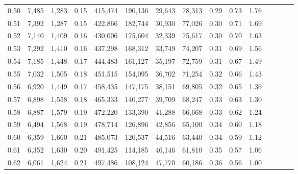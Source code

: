 \begin{tabular}{rrrcrrrrrrrrrrr}
0.50 &  7,485 &  1,283 &                                       0.15 &  415,474 &  190,136 &   29,643 &   78,313 &  0.29 &  0.73 &                         1.76 \\
0.51 &  7,392 &  1,287 &                                       0.15 &  422,866 &  182,744 &   30,930 &   77,026 &  0.30 &  0.71 &                         1.69 \\
0.52 &  7,140 &  1,409 &                                       0.16 &  430,006 &  175,604 &   32,339 &   75,617 &  0.30 &  0.70 &                         1.63 \\
0.53 &  7,292 &  1,410 &                                       0.16 &  437,298 &  168,312 &   33,749 &   74,207 &  0.31 &  0.69 &                         1.56 \\
0.54 &  7,185 &  1,448 &                                       0.17 &  444,483 &  161,127 &   35,197 &   72,759 &  0.31 &  0.67 &                         1.49 \\
0.55 &  7,032 &  1,505 &                                       0.18 &  451,515 &  154,095 &   36,702 &   71,254 &  0.32 &  0.66 &                         1.43 \\
0.56 &  6,920 &  1,449 &                                       0.17 &  458,435 &  147,175 &   38,151 &   69,805 &  0.32 &  0.65 &                         1.36 \\
0.57 &  6,898 &  1,558 &                                       0.18 &  465,333 &  140,277 &   39,709 &   68,247 &  0.33 &  0.63 &                         1.30 \\
0.58 &  6,887 &  1,579 &                                       0.19 &  472,220 &  133,390 &   41,288 &   66,668 &  0.33 &  0.62 &                         1.24 \\
0.59 &  6,494 &  1,568 &                                       0.19 &  478,714 &  126,896 &   42,856 &   65,100 &  0.34 &  0.60 &                         1.18 \\
0.60 &  6,359 &  1,660 &                                       0.21 &  485,073 &  120,537 &   44,516 &   63,440 &  0.34 &  0.59 &                         1.12 \\
0.61 &  6,352 &  1,630 &                                       0.20 &  491,425 &  114,185 &   46,146 &   61,810 &  0.35 &  0.57 &                         1.06 \\
0.62 &  6,061 &  1,624 &                                       0.21 &  497,486 &  108,124 &   47,770 &   60,186 &  0.36 &  0.56 &                         1.00 \\

\end{tabular}
